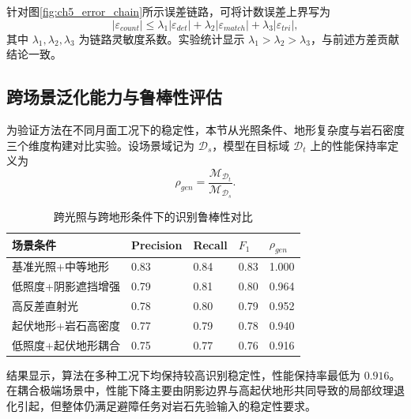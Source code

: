 针对图\ref{fig:ch5_error_chain}所示误差链路，可将计数误差上界写为
\begin{equation}
|\varepsilon_{count}|\le
\lambda_1|\varepsilon_{det}|+
\lambda_2|\varepsilon_{match}|+
\lambda_3|\varepsilon_{tri}|,
\label{eq:ch5_count_error_bound}
\end{equation}
其中 $\lambda_1,\lambda_2,\lambda_3$ 为链路灵敏度系数。实验统计显示 $\lambda_1>\lambda_2>\lambda_3$，与前述方差贡献结论一致。

\subsection{跨场景泛化能力与鲁棒性评估}
\label{subsec:ch5_generalization}

为验证方法在不同月面工况下的稳定性，本节从光照条件、地形复杂度与岩石密度三个维度构建对比实验。设场景域记为 $\mathcal{D}_s$，模型在目标域 $\mathcal{D}_t$ 上的性能保持率定义为
\begin{equation}
\rho_{gen}=\frac{\mathcal{M}_{\mathcal{D}_t}}{\mathcal{M}_{\mathcal{D}_s}}.
\label{eq:ch5_generalization_ratio}
\end{equation}

\begin{table}[H]
	\centering
	\small
	\caption{跨光照与跨地形条件下的识别鲁棒性对比}
	\label{tab:ch5_cross_scene}
	\begin{tabular}{p{}p{}p{}p{}p{}}
		\toprule
		场景条件 & Precision & Recall & $F_1$ & $\rho_{gen}$ \\
		\midrule
		基准光照+中等地形 & 0.83 & 0.84 & 0.83 & 1.000 \\
		低照度+阴影遮挡增强 & 0.79 & 0.81 & 0.80 & 0.964 \\
		高反差直射光 & 0.78 & 0.80 & 0.79 & 0.952 \\
		起伏地形+岩石高密度 & 0.77 & 0.79 & 0.78 & 0.940 \\
		低照度+起伏地形耦合 & 0.75 & 0.77 & 0.76 & 0.916 \\
		\bottomrule
	\end{tabular}
\end{table}

结果显示，算法在多种工况下均保持较高识别稳定性，性能保持率最低为 $0.916$。在耦合极端场景中，性能下降主要由阴影边界与高起伏地形共同导致的局部纹理退化引起，但整体仍满足避障任务对岩石先验输入的稳定性要求。

